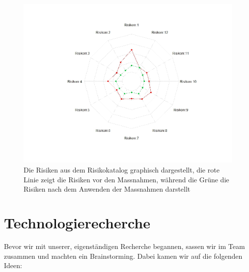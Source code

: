 \documentclass[a4paper]{report}
\begin{document}
\begin{figure}[h!]
	\centering
	\includegraphics[width=\textwidth,keepaspectratio]{Risikomatrix_Spinne}
	\caption{Die Risiken aus dem Risikokatalog graphisch dargestellt, die rote Linie zeigt die Risiken vor den Massnahmen, während die Grüne die Risiken nach dem Anwenden der Massnahmen darstellt}
	\label{fig:Risikomatrix_Spinne}
\end{figure}

\chapter{Technologierecherche}

Bevor wir mit unserer, eigenständigen Recherche begannen, sassen wir im Team zusammen und machten ein Brainstorming. Dabei kamen wir auf die folgenden Ideen:
\end{document}
